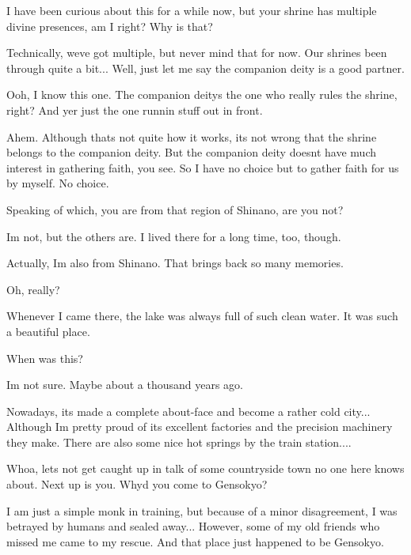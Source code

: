 \begin{tcolorbox}[breakable, colback=white, colframe=black!80,
  boxrule=0.6pt, arc=0mm, left=3mm, right=3mm, top=2mm, bottom=2mm]
\medskip
I have been curious about this for a while now, but your shrine has multiple divine presences, am I right? Why is that?\par
\medskip
Technically, we\textquotesingle{}ve got multiple, but never mind that for now. Our shrine\textquotesingle{}s been through quite a bit... Well, just let me say the companion deity is a good partner.\par
\medskip
Ooh, I know this one. The companion deity\textquotesingle{}s the one who really rules the shrine, right? And yer just the one runnin\textquotesingle{} stuff out in front.\par
\medskip
Ahem. Although that\textquotesingle{}s not quite how it works, it\textquotesingle{}s not wrong that the shrine belongs to the companion deity. But the companion deity doesn\textquotesingle{}t have much interest in gathering faith, you see. So I have no choice but to gather faith for us by myself. No choice.\par
\medskip
Speaking of which, you are from that region of Shinano, are you not?\par
\medskip
I\textquotesingle{}m not, but the others are. I lived there for a long time, too, though.\par
\medskip
Actually, I\textquotesingle{}m also from Shinano. That brings back so many memories.\par
\medskip
Oh, really?\par
\medskip
Whenever I came there, the lake was always full of such clean water. It was such a beautiful place.\par
\medskip
When was this?\par
\medskip
I\textquotesingle{}m not sure. Maybe about a thousand years ago.\par
\medskip
Nowadays, it\textquotesingle{}s made a complete about-{}face and become a rather cold city... Although I\textquotesingle{}m pretty proud of its excellent factories and the precision machinery they make. There are also some nice hot springs by the train station....\par
{}\par
\medskip
Whoa, let\textquotesingle{}s not get caught up in talk of some countryside town no one here knows about. Next up is you. Why\textquotesingle{}d you come to Gensokyo?\par
\medskip
I am just a simple monk in training, but because of a minor disagreement, I was betrayed by humans and sealed away... However, some of my old friends who missed me came to my rescue. And that place just happened to be Gensokyo.\par

\end{tcolorbox}
